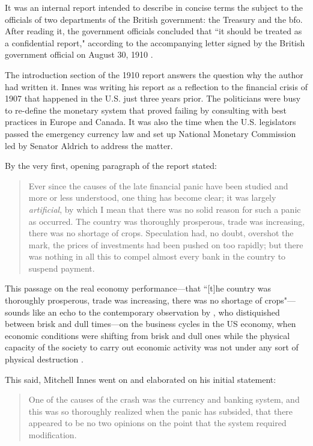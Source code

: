 It was an internal report intended to describe in concise terms the subject to the officials of two departments of the British government: the Treasury and the \ac{bfo}. After reading it, the government officials concluded that ``it should be treated as a confidential report," according to the accompanying letter signed by the British government official on August 30, 1910 \citep[p.~41]{innes1910}.

The introduction section of the 1910 report answers the question why the author had written it. Innes was writing his report as a reflection to the financial crisis of 1907 that happened in the U.S. just three years prior. The politicians were busy to re-define the monetary system that proved failing by consulting with best practices in Europe and Canada. It was also the time when the U.S. legislators passed the emergency currency law and set up National Monetary Commission led by Senator Aldrich to address the matter.

By the very first, opening paragraph of the report \citeauthor{innes1910} stated:

\begin{quote}
Ever since the causes of the late financial panic have been studied and more or less understood, one thing has become clear; it was largely \textit{artificial}, by which I mean that there was no solid reason for such a panic as occurred. The country was thoroughly prosperous, trade was increasing, there was no shortage of crops. Speculation had, no doubt, overshot the mark, the prices of investments had been pushed on too rapidly; but there was nothing in all this to compel almost every bank in the country to suspend payment. \citep[p.~5, emphasis added]{innes1910}
\end{quote}

This passage on the real economy performance---that ``[t]he country was thoroughly prosperous, trade was increasing, there was no shortage of crops"---sounds like an echo to the contemporary observation by \citeauthor{veblen1904}, who distiquished between brisk and dull times---on the business cycles in the US economy, when economic conditions were shifting from brisk and dull ones while the physical capacity of the society to carry out economic activity was not under any sort of physical destruction \citep[p.~89]{veblen1904}.

This said, Mitchell Innes went on and elaborated on his initial statement:

\begin{quote}
One of the causes of the crash was the currency and banking system, and this was so thoroughly realized when the panic has subsided, that there appeared to be no two opinions on the point that the system required modification. \citep[p.~5, emphasis added]{innes1910}
\end{quote}

